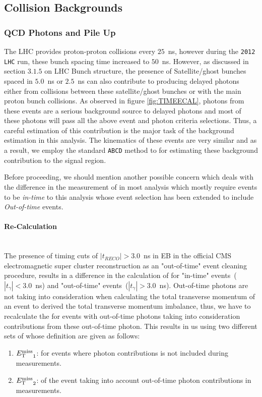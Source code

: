 \subsection{Collision Backgrounds}

\subsubsection{QCD Photons and Pile Up}
The LHC provides proton-proton collisions every $25$~ns, however during the \texttt{2012 LHC} run, these bunch spacing time increased to $50$~ns. However, as discussed in section $3.1.5$ on LHC Bunch structure, the presence of 
Satellite/ghost bunches spaced in $5.0$~ns or $2.5$~ns  can also contribute to producing delayed photons either from collisions between these satellite/ghost bunches or with the main proton bunch collisions.
As observed in figure \ref{fig:TIMEECAL}, photons from these events are a serious background source to delayed photons and most of these photons will pass all the above event and photon criteria selections. Thus, a careful 
estimation of this contribution is the major task of the background estimation in this analysis.
The kinematics of these events are very similar and as a result, we employ the standard \texttt{ABCD} method to for estimating these background contribution  to the signal region.

Before proceeding, we should mention another possible concern which deals with the difference in the measurement of \MET in most analysis which mostly require events to be \textit{in-time} to this
analysis whose event selection has been extended to include \textit{Out-of-time} events.

\paragraph*{\MET Re-Calculation}\mbox{}\\
The presence of timing cuts of $|t_{RECO}| > 3.0$~ns in EB in the official CMS electromagnetic super cluster reconstruction as an "out-of-time" event cleaning procedure, results in a difference in the calculation of \MET for "in-time" events~($|t_{\gamma}| < 3.0$~ns) and "out-of-time" events~($|t_{\gamma}| > 3.0$~ns). Out-of-time photons are not taking into consideration when calculating the total transverse momentum of an event to derived the total transverse momentum imbalance, thus, we have to recalculate the \MET for events with out-of-time photons taking into consideration \pt contributions from these out-of-time photon. This results in us using two different sets of \MET whose   definition are given as follows:
\begin{enumerate}
\item ${E_{\mathrm{T}}^{\text{miss}}}_{1}$: \MET for events where photon \pt contributions is not included during \MET measurements.
\item ${E_{\mathrm{T}}^{\text{miss}}}_{2}$: \MET of the event taking into account out-of-time photon \pt contributions in \MET measurements.
\end{enumerate}
  
